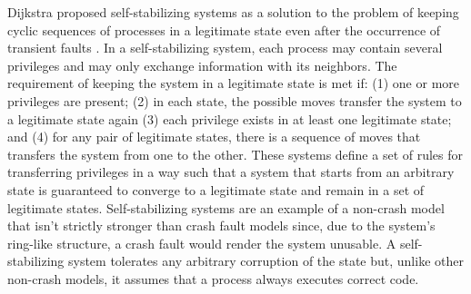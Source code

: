 Dijkstra proposed self-stabilizing systems as a solution to the problem of keeping cyclic sequences of processes in a legitimate state even after the occurrence of transient faults \cite{Dijkstra1974}. In a self-stabilizing system, each process may contain several privileges and may only exchange information with its neighbors. The requirement of keeping the system in a legitimate state is met if: (1) one or more privileges are present; (2) in each state, the possible moves transfer the system to a legitimate state again (3) each privilege exists in at least one legitimate state; and (4) for any pair of legitimate states, there is a sequence of moves that transfers the system from one to the other. These systems define a set of rules for transferring privileges in a way such that a system that starts from an arbitrary state is guaranteed to converge to a legitimate state and remain in a set of legitimate states. Self-stabilizing systems are an example of a non-crash model that isn't strictly stronger than crash fault models since, due to the system's ring-like structure, a crash fault would render the system unusable. A self-stabilizing system tolerates any arbitrary corruption of the state but, unlike other non-crash models, it assumes that a process always executes correct code.\par
